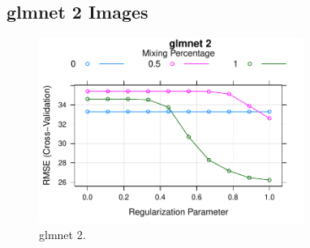 
\subsection{glmnet 2 Images} 
 

\begin{figure} 
\centering  
\includegraphics[width=0.77\textwidth]{Code_Outputs/ML_report_task_2glmnet_RMSEvNVariables.pdf} 
\caption{\label{fig:ML_report_task_2glmnetRMSEvNVariables}glmnet 2.} 
\end{figure} 
 
